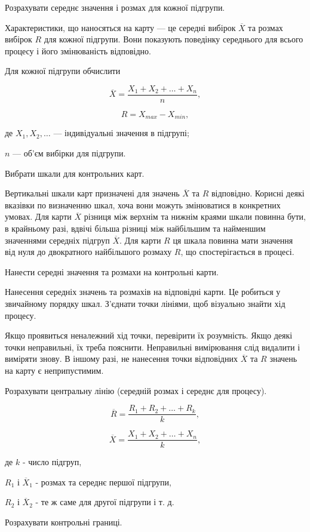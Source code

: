 Розрахувати середнє значення і розмах для кожної підгрупи.

Характеристики, що наносяться на карту — це середні вибірок $\overline{X}$ та розмах вибірок $R$ для кожної підгрупи. Вони показують поведінку середнього для всього процесу і його змінюваність відповідно.

Для кожної підгрупи обчислити

\[
\overline{X} = \frac{X_1 + X_2 + \ldots + X_n}{n}, \tag{3.11}
\]

\[
R = X_{max} - X_{min},
\]

де $X_1, X_2, \ldots$ — індивідуальні значення в підгрупі;

$n$ — об'єм вибірки для підгрупи.

Вибрати шкали для контрольних карт.

Вертикальні шкали карт призначені для значень $\overline{X}$ та $R$ відповідно. Корисні деякі вказівки по визначенню шкал, хоча вони можуть змінюватися в конкретних умовах. Для карти $\overline{X}$ різниця між верхнім та нижнім краями шкали повинна бути, в крайньому разі, вдвічі більша різниці між найбільшим та найменшим значеннями середніх підгруп $\overline{X}$. Для карти $R$ ця шкала повинна мати значення від нуля до двократного найбільшого розмаху $R$, що спостерігається в процесі.

Нанести середні значення та розмахи на контрольні карти.

Нанесення середніх значень та розмахів на відповідні карти. Це робиться у звичайному порядку шкал. З'єднати точки лініями, щоб візуально знайти хід процесу.

Якщо проявиться неналежний хід точки, перевірити їх розумність. Якщо деякі точки неправильні, їх треба пояснити. Неправильні вимірювання слід видалити і виміряти знову. В іншому разі, не нанесення точки відповідних $\overline{X}$ та $R$ значень на карту є неприпустимим.

Розрахувати центральну лінію (середній розмах і середнє для процесу).

\[
\overline{R} = \frac{R_1 + R_2 + \ldots + R_k}{k}, \tag{3.12}
\]

\[
\overline{X} = \frac{X_1 + X_2 + \ldots + X_n}{k}, \tag{3.13}
\]

де $k$ - число підгруп,

$R_1$ і $\overline{X}_1$ - розмах та середнє першої підгрупи,

$R_2$ і $\overline{X}_2$ - те ж саме для другої підгрупи і т. д.

Розрахувати контрольні границі.

